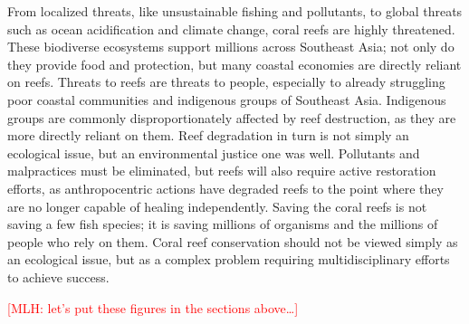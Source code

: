 \documentclass{book}\usepackage{knitr}
\newcommand{\red}[1]{\textcolor{red}{[MLH: #1]}}
\begin{document}
{From localized threats, like unsustainable fishing and pollutants, to global threats such as ocean acidification and climate change, coral reefs are highly threatened. These biodiverse ecosystems support millions across Southeast Asia; not only do they provide food and protection, but many coastal economies are directly reliant on reefs. Threats to reefs are threats to people, especially to already struggling poor coastal communities and indigenous groups of Southeast Asia. Indigenous groups are commonly disproportionately affected by reef destruction, as they are more directly reliant on them. Reef degradation in turn is not simply an ecological issue, but an environmental justice one was well. Pollutants and malpractices must be eliminated, but reefs will also require active restoration efforts, as anthropocentric actions have degraded reefs to the point where they are no longer capable of healing independently. Saving the coral reefs is not saving a few fish species; it is saving millions of organisms and the millions of people who rely on them. Coral reef conservation should not be viewed simply as an ecological issue, but as a complex problem requiring multidisciplinary efforts to achieve success.

\red{let's put these figures in the sections above\ldots}


}
\end{document}
